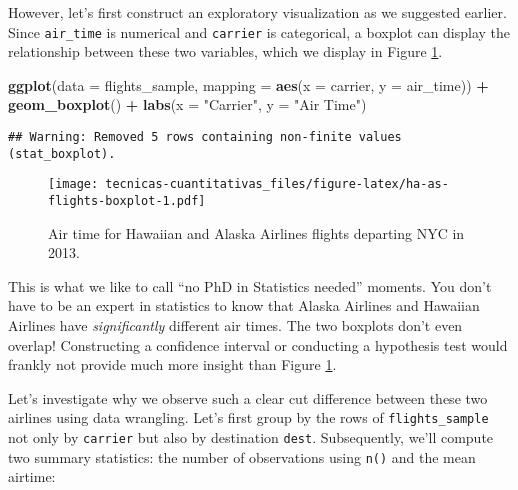 \documentclass[
]{book}
\newenvironment{Shaded}{\begin{snugshade}}{\end{snugshade}}
\newcommand{\DataTypeTok}[1]{\textcolor[rgb]{0.13,0.29,0.53}{#1}}
\newcommand{\KeywordTok}[1]{\textcolor[rgb]{0.13,0.29,0.53}{\textbf{#1}}}
\newcommand{\NormalTok}[1]{#1}
\newcommand{\OperatorTok}[1]{\textcolor[rgb]{0.81,0.36,0.00}{\textbf{#1}}}
\newcommand{\OtherTok}[1]{\textcolor[rgb]{0.56,0.35,0.01}{#1}}
\newcommand{\StringTok}[1]{\textcolor[rgb]{0.31,0.60,0.02}{#1}}
\begin{document}
However, let's first construct an exploratory visualization as we suggested earlier. Since \texttt{air\_time} is numerical and \texttt{carrier} is categorical, a boxplot can display the relationship between these two variables, which we display in Figure \ref{fig:ha-as-flights-boxplot}.

\begin{Shaded}
\begin{Highlighting}[]
\KeywordTok{ggplot}\NormalTok{(}\DataTypeTok{data =}\NormalTok{ flights_sample, }\DataTypeTok{mapping =} \KeywordTok{aes}\NormalTok{(}\DataTypeTok{x =}\NormalTok{ carrier, }\DataTypeTok{y =}\NormalTok{ air_time)) }\OperatorTok{+}
\StringTok{  }\KeywordTok{geom_boxplot}\NormalTok{() }\OperatorTok{+}
\StringTok{  }\KeywordTok{labs}\NormalTok{(}\DataTypeTok{x =} \StringTok{"Carrier"}\NormalTok{, }\DataTypeTok{y =} \StringTok{"Air Time"}\NormalTok{)}
\end{Highlighting}
\end{Shaded}

\begin{verbatim}
## Warning: Removed 5 rows containing non-finite values (stat_boxplot).
\end{verbatim}

\begin{figure}
\centering
\texttt{[image: tecnicas-cuantitativas\_files/figure-latex/ha-as-flights-boxplot-1.pdf]}
\caption{\label{fig:ha-as-flights-boxplot}Air time for Hawaiian and Alaska Airlines flights departing NYC in 2013.}
\end{figure}

This is what we like to call ``no PhD in Statistics needed'' moments. You don't have to be an expert in statistics to know that Alaska Airlines and Hawaiian Airlines have \emph{significantly} different air times. The two boxplots don't even overlap! Constructing a confidence interval or conducting a hypothesis test would frankly not provide much more insight than Figure \ref{fig:ha-as-flights-boxplot}.

Let's investigate why we observe such a clear cut difference between these two airlines using data wrangling. Let's first group by the rows of \texttt{flights\_sample} not only by \texttt{carrier} but also by destination \texttt{dest}. Subsequently, we'll compute two summary statistics: the number of observations using \texttt{n()} and the mean airtime:

\begin{Shaded}
\end{Shaded}
\end{document}
